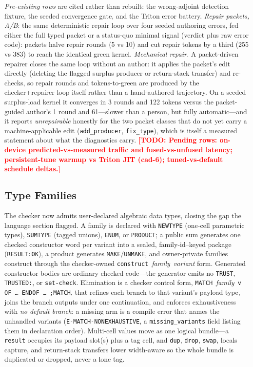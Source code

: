 \documentclass[11pt]{article}
\newcommand{\todo}[1]{\textcolor{red}{\textbf{[TODO: #1]}}}
\newcommand{\code}[1]{\texttt{#1}}
\begin{document}
\emph{Pre-existing rows} are cited rather than rebuilt: the wrong-adjoint
detection fixture, the seeded convergence gate, and the Triton error
battery. \emph{Repair packets, A/B}: the same
deterministic repair loop over four seeded authoring errors, fed either
the full typed packet or a status-quo minimal signal (verdict plus raw
error code): packets halve repair rounds (5 vs 10) and cut repair tokens
by a third (255 vs 383) to reach the identical green kernel.
\emph{Mechanical repair.} A packet-driven repairer closes the same loop
without an author: it applies the packet's edit directly (deleting the
flagged surplus producer or return-stack transfer) and re-checks, so
repair rounds and tokens-to-green are produced by the checker+repairer
loop itself rather than a hand-authored trajectory. On a seeded
surplus-load kernel it converges in 3 rounds and 122 tokens versus the
packet-guided author's 1 round and 61---slower than a person, but fully
automatic---and it reports \emph{unrepairable} honestly for the two
packet classes that do not yet carry a machine-applicable edit
(\code{add\_producer}, \code{fix\_type}), which is itself a measured
statement about what the diagnostics carry.
\todo{Pending rows: on-device predicted-vs-measured traffic and
fused-vs-unfused latency; persistent-tune warmup vs Triton JIT (cad-6);
tuned-vs-default schedule deltas.}

\subsection{Type Families}\label{sec:tfam}
The checker now admits user-declared algebraic data types, closing the gap
the language section flagged. A family is declared with \code{NEWTYPE}
(one-cell parametric types), \code{SUMTYPE} (tagged unions), \code{ENUM}, or
\code{PRODUCT}; a public sum generates one checked constructor word per
variant into a sealed, family-id--keyed package (\code{RESULT:OK}), a product
generates \code{MAKE}/\code{UNMAKE}, and owner-private families construct
through the checker-owned \code{construct}~\emph{family}~\emph{variant} form.
Generated constructor bodies are ordinary checked code---the generator emits
no \code{TRUST}, \code{TRUSTED:}, or \code{set-check}. Elimination is a checker
control form, \code{MATCH}~\emph{family}~\code{v OF \ldots{} ENDOF \ldots{}
;MATCH}, that refines each branch to that variant's payload type, joins the
branch outputs under one continuation, and enforces exhaustiveness with
\emph{no default branch}: a missing arm is a compile error that names the
unhandled variants (\code{E-MATCH-NONEXHAUSTIVE}, a \code{missing\_variants}
field listing them in declaration order). Multi-cell values move as one
logical bundle---a \code{result} occupies its payload slot(s) plus a tag cell,
and \code{dup}, \code{drop}, \code{swap}, locals capture, and return-stack
transfers lower width-aware so the whole bundle is duplicated or dropped,
never a lone tag.
\end{document}
